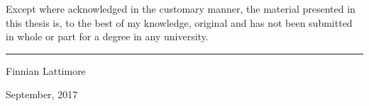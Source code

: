 \clearpage
\vspace*{\fill}
\begin{center}
\begin{minipage}{.9\textwidth}
Except where acknowledged in the customary manner, the material 
presented in this thesis is, to the best of my knowledge, original and has not been submitted in whole or part for a degree in any 
university.

\vspace{40mm}  %

\hspace{80mm}\rule{40mm}{.15mm}\par   %
\hspace{80mm} Finnian Lattimore\par
\hspace{80mm} September, 2017
\end{minipage}
\end{center}
\vfill %
\clearpage